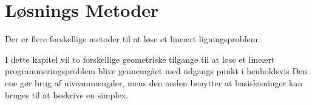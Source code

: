 \chapter{Løsnings Metoder}	
Der er flere forskellige metoder til at løse et lineært ligningsproblem. 

I dette kapitel vil to forskellige geometriske tilgange til at løse et lineært programmeringsproblem blive gennemgået med udgangs punkt i henholdsvis %
Den ene gør brug af niveaumængder, mens den anden benytter at basisløsninger kan bruges til at beskrive en simplex.








